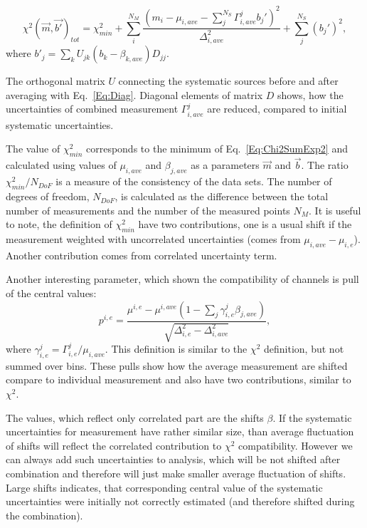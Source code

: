 \begin{equation}
  \chi^2(\vec{m},\vec{b'})_{tot} = \chi^2_{min} + 
  \sum_{i}^{N_M} \frac{(m_i-\mu_{i,ave}-\sum_j^{N_S} \Gamma_{i,ave}^j b_j')^2}{\Delta_{i,ave}^2} + \sum_{j}^{N_S}  (b_j')^2,
\label{Eq:ChiAfter}
\end{equation}
where $b'_j = \sum_k U_{jk}(b_k - \beta_{k,ave})D_{jj}$.

The orthogonal matrix $U$ connecting the systematic sources before and after averaging with Eq.~\ref{Eq:Diag}. Diagonal elements of matrix $D$ shows, how the uncertainties of combined measurement $\Gamma^j_{i,ave}$ are reduced, compared to initial systematic uncertainties.

The value of $\chi^2_{min}$ corresponds to the minimum of Eq.~\ref{Eq:Chi2SumExp2} and calculated using values of $\mu_{i, ave}$ and $\beta_{j, ave}$ as a parameters $\vec{m}$ and $\vec{b}$. The ratio $\chi^2_{min}/N_{DoF}$ is a measure of the consistency of the
data sets. The number of degrees of freedom, $N_{DoF}$, is calculated as the difference between the total number of measurements and the number of the measured points $N_M$. It is useful to note, the definition of $\chi^2_{min}$ have two contributions, one is a usual shift if the measurement weighted with uncorrelated uncertainties (comes from $\mu_{i, ave} - \mu_{i,e}$). Another contribution comes from correlated uncertainty term. %

Another interesting parameter, which shown the compatibility of channels is pull of the central values:
\begin{equation}
p^{i,e} = \frac{\mu^{i,e} - \mu^{i,ave}(1 - \sum_j\gamma_{i,e}^j\beta_{j,ave})}{\sqrt{\Delta^2_{i,e}-\Delta^2_{i,ave} } },
\label{Eq:Pulls}
\end{equation}
where $\gamma^j_{i,e} = \Gamma^j_{i,e} / \mu_{i,ave}$. This definition is similar to the $\chi^2$ definition, but not summed over bins. These pulls show how the average measurement are shifted compare to individual measurement and also have two contributions, similar to $\chi^2$.

The values, which reflect only correlated part are the shifts $\beta$. If the systematic uncertainties for measurement have rather similar size, than average fluctuation of shifts will reflect the correlated contribution to $\chi^2$ compatibility. However we can always add such uncertainties to analysis, which will be not shifted after combination and therefore will just make smaller average fluctuation of shifts. Large shifts indicates, that corresponding central value of the systematic uncertainties were initially not correctly estimated (and therefore shifted during the combination).

